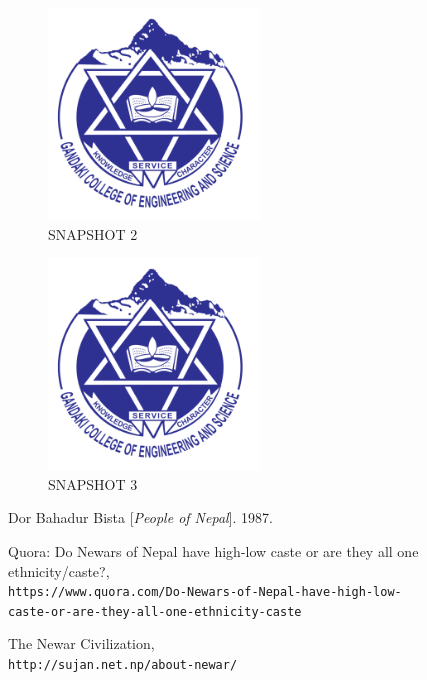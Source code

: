 \documentclass[a4paper, 14pt]{report}
\begin{document}
\begin{description}
\begin{center}
\begin{figure}[h!]
  \includegraphics[width=0.5\textwidth]{gces.png}
  \caption{SNAPSHOT 2}
\end{figure}

\begin{figure}[h!]
  \includegraphics[width=0.5\textwidth]{gces.png}
  \caption{SNAPSHOT 3}
\end{figure}
\end{center}
	
\end{description}
	
	\newpage
	\begin{thebibliography}{9}

		Dor Bahadur Bista
			[\textit{People of Nepal}].
		1987.

		Quora: Do Newars of Nepal have high-low caste or are they all one ethnicity/caste?,
		\\\texttt{https://www.quora.com/Do-Newars-of-Nepal-have-high-low- \\ caste-or-are-they-all-one-ethnicity-caste}

		The Newar Civilization,
		\\\texttt{http://sujan.net.np/about-newar/}

	\end{thebibliography}

	
\end{document}
